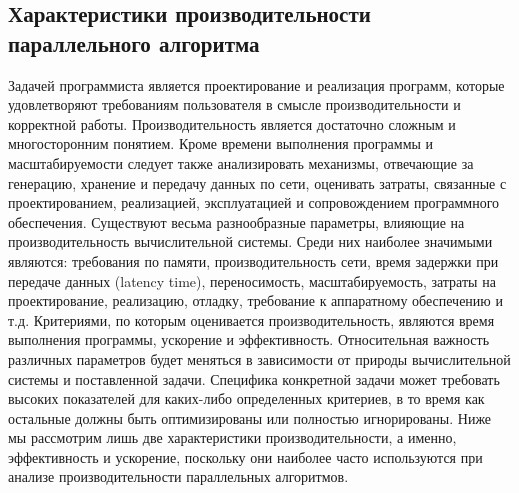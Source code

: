 \subsection{Характеристики производительности параллельного алгоритма}
Задачей программиста является проектирование и реализация программ, которые удовлетворяют требованиям пользователя в смысле производительности и корректной работы. Производительность является достаточно сложным и многосторонним понятием. Кроме времени выполнения программы и масштабируемости следует также анализировать механизмы, отвечающие за генерацию, хранение и передачу данных по сети, оценивать затраты, связанные с проектированием, реализацией, эксплуатацией и сопровождением программного обеспечения. Существуют весьма разнообразные параметры, влияющие на производительность вычислительной системы. Среди них наиболее значимыми являются: требования по памяти, производительность сети, время задержки при передаче данных (latency time), переносимость, масштабируемость, затраты на проектирование, реализацию, отладку, требование к аппаратному обеспечению и т.д. Критериями, по которым оценивается производительность, являются время выполнения программы, ускорение и эффективность.
Относительная важность различных параметров будет меняться в зависимости от природы вычислительной системы и поставленной задачи. Специфика конкретной задачи может требовать высоких показателей для каких-либо определенных критериев, в то время как остальные должны быть оптимизированы или полностью игнорированы. 
Ниже мы рассмотрим лишь две характеристики производительности, а именно, эффективность и ускорение, поскольку они наиболее часто используются при анализе производительности параллельных алгоритмов.
